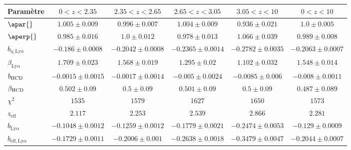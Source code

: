 \begin{table}[h]
\begin{tabular}{lccccc}
\toprule
Param\`etre  & $\num{0} < z < \num{2.35}$ & $\num{2.35} < z < \num{2.65}$ & $\num{2.65} < z < \num{3.05}$ & $\num{3.05} < z < \num{10}$  & $\num{0} < z < \num{10}$ \\
\midrule
$\apar{} $ & $ 1.005 \pm 0.009$ & $ 0.996 \pm 0.007$ & $ 1.004 \pm 0.009$ & $ 0.936 \pm 0.021$ & $ 1.0 \pm 0.005$ \\
$\aperp{} $ & $ 0.985 \pm 0.016$ & $ 1.0 \pm 0.012$ & $ 0.978 \pm 0.013$ & $ 1.066 \pm 0.039$ & $ 0.989 \pm 0.008$ \\
$b_{\eta, \mathrm{Ly}\alpha} $ & $ -0.186 \pm 0.0008$ & $ -0.2042 \pm 0.0008$ & $ -0.2365 \pm 0.0014$ & $ -0.2782 \pm 0.0035$ & $ -0.2063 \pm 0.0007$ \\
$\beta_{\mathrm{Ly}\alpha} $ & $ 1.709 \pm 0.023$ & $ 1.568 \pm 0.019$ & $ 1.295 \pm 0.02$ & $ 1.102 \pm 0.032$ & $ 1.548 \pm 0.014$ \\
$b_{\textsc{HCD}} $ & $ -0.0015 \pm 0.0015$ & $ -0.0017 \pm 0.0014$ & $ -0.005 \pm 0.0024$ & $ -0.0085 \pm 0.006$ & $ -0.008 \pm 0.0011$ \\
$\beta_{\textsc{HCD}} $ & $ 0.502 \pm 0.09$ & $ 0.5 \pm 0.09$ & $ 0.501 \pm 0.09$ & $ 0.5 \pm 0.09$ & $ 0.487 \pm 0.089$ \\
\midrule
$\chi^2$ & $ 1535 $ & $ 1579 $ & $ 1627 $ & $ 1650 $ & $ 1573 $ \\
$z_{\mathrm{eff}}$ & $ 2.117 $ & $ 2.253 $ & $ 2.539 $ & $ 2.866 $ & $ 2.281 $ \\
\midrule
$b_{\mathrm{Ly}\alpha} $ & $ -0.1048 \pm 0.0012$ & $ -0.1259 \pm 0.0012$ & $ -0.1779 \pm 0.0021$ & $ -0.2474 \pm 0.0053$ & $ -0.129 \pm 0.0009$ \\
$b_{\mathrm{eff}, \mathrm{Ly}\alpha} $ & $ -0.1729 \pm 0.0011$ & $ -0.2006 \pm 0.001$ & $ -0.2638 \pm 0.0018$ & $ -0.3479 \pm 0.0047$ & $ -0.2044 \pm 0.0007$ \\
\bottomrule
  \end{tabular}
\end{table}

